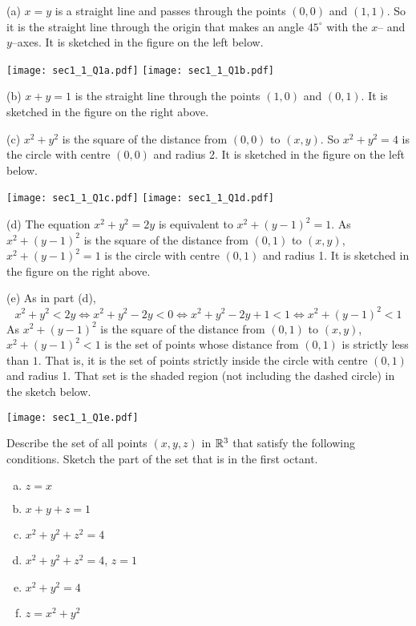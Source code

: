 \begin{solution}
(a) $x=y$ is a straight line and passes through the points $(0,0)$
and $(1,1)$. So it is the straight line through the origin that makes an angle $45^\circ$ with the $x$-- and $y$--axes. It is sketched in the figure on the 
left below.

\begin{center}
     \texttt{[image: sec1\_1\_Q1a.pdf]}\qquad\qquad
     \texttt{[image: sec1\_1\_Q1b.pdf]}
\end{center}

(b) $x+y=1$ is the straight line through the points $(1,0)$ and
$(0,1)$. It is sketched in the figure on the right above.

(c) $x^2+y^2$ is the square of the distance from $(0,0)$ to $(x,y)$.
So $x^2+y^2=4$ is the circle with centre $(0,0)$ and radius 2.
It is sketched in the figure on the left below.

\begin{center}
     \texttt{[image: sec1\_1\_Q1c.pdf]}\qquad\qquad
     \texttt{[image: sec1\_1\_Q1d.pdf]}
\end{center}

(d) The equation $x^2+y^2=2y$ is equivalent to  $x^2+(y-1)^2=1$.
As $x^2+(y-1)^2$ is the square of the distance from $(0,1)$ to $(x,y)$,
$x^2+(y-1)^2=1$ is the circle with centre $(0,1)$ and radius 1.
It is sketched in the figure on the right above.

(e) As in part (d),
\begin{equation*}
x^2+y^2<2y
\iff x^2+y^2-2y<0
\iff x^2+y^2-2y+1<1
\iff x^2+(y-1)^2<1
\end{equation*}
As $x^2+(y-1)^2$ is the square of the distance from $(0,1)$ to $(x,y)$,
$x^2+(y-1)^2<1$ is the set of points whose distance from $(0,1)$ is 
strictly less than $1$. That is, it is the set of points strictly inside 
the circle with centre $(0,1)$ and radius 1.
That set is the shaded region (not including the dashed circle) 
in the sketch below.

\begin{center}
     \texttt{[image: sec1\_1\_Q1e.pdf]}
\end{center}
\end{solution}

\begin{question}
Describe the set of all points $(x,y,z)$ in $\mathbb{R}^3$ that satisfy
the following conditions. Sketch the part of the set that is in the 
first octant.
\begin{enumerate}[(a)]
\item
$z = x$
\item
$x + y + z = 1$
\item
$x^2 + y^2 + z^2 = 4$
\item
$x^2 + y^2 + z^2 = 4$, $z = 1$
\item
$x^2+y^2=4$
\item
$z = x^2 + y^2$
\end{enumerate}
\end{question}

